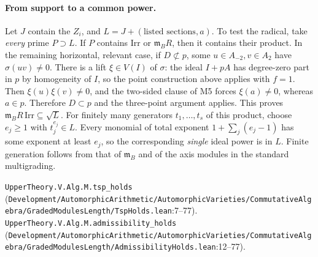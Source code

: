 \paragraph{From support to a common power.}
Let $J$ contain the $Z_i$, and $L=J+(\text{listed sections},a)$.
To test the radical, take \emph{every} prime $P\supset L$.
If $P$ contains $\mathrm{Irr}$ or $\mathfrak m_BR$, then it contains their product.
In the remaining horizontal, relevant case, if $D\not\subset p$, some
$u\in A_{-2},v\in A_2$ have $\sigma(uv)\ne0$. There is a lift
$\xi\in V(I)$ of $\sigma$: the ideal $I+pA$ has degree-zero part in $p$
by homogeneity of $I$, so the point construction above applies with $f=1$.
Then $\xi(u)\xi(v)\ne0$, and the two-sided clause of M5 forces
$\xi(a)\ne0$, whereas $a\in p$. Therefore $D\subset p$ and the
three-point argument applies. This proves
$\mathfrak m_BR\,\mathrm{Irr}\subseteq\sqrt L$. For finitely many generators
$t_1,\ldots,t_s$ of this product, choose $e_j\ge1$ with $t_j^{e_j}\in L$.
Every monomial of total exponent $1+\sum_j(e_j-1)$ has some exponent at
least $e_j$, so the corresponding \emph{single} ideal power is in $L$.
Finite generation follows from that of $\mathfrak m_B$ and of the axis
modules in the standard multigrading.
\par{\footnotesize \nolinkurl{UpperTheory.V.Alg.M.tsp_holds} (\nolinkurl{Development/AutomorphicArithmetic/AutomorphicVarieties/CommutativeAlgebra/GradedModulesLength/TspHolds.lean}\allowbreak:7--77). \nolinkurl{UpperTheory.V.Alg.M.admissibility_holds} (\nolinkurl{Development/AutomorphicArithmetic/AutomorphicVarieties/CommutativeAlgebra/GradedModulesLength/AdmissibilityHolds.lean}\allowbreak:12--77).\par}

